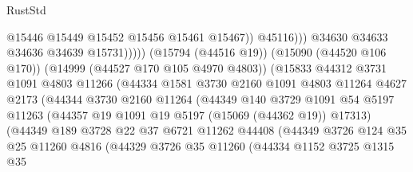 \begin{lexlean}{RustStd}
\begin{coremodule}
                                          @15446
                                          @15449
                                          @15452
                                          @15456
                                          @15461
                                          @15467))
                                      @45116)))
                                @34630
                                @34633
                                @34636
                                @34639
                                @15731)))))
                      (@15794 (@44516 @19))
                      (@15090 (@44520 @106 @170))
                      (@14999 (@44527 @170 @105 @4970 @4803))
                      (@15833
                        @44312
                        @3731
                        @1091
                        @4803
                        @11266
                        (@44334
                          @1581
                          @3730
                          @2160
                          @1091
                          @4803
                          @11264
                          @4627
                          @2173
                          (@44344
                            @3730
                            @2160
                            @11264
                            (@44349
                              @140
                              @3729
                              @1091
                              @54
                              @5197
                              @11263
                              (@44357 @19 @1091 @19 @5197 (@15069 (@44362 @19)) @17313)
                              (@44349
                                @189
                                @3728
                                @22
                                @37
                                @6721
                                @11262
                                @44408
                                (@44349
                                  @3726
                                  @124
                                  @35
                                  @25
                                  @11260
                                  @4816
                                  (@44329
                                    @3726
                                    @35
                                    @11260
                                    (@44334
                                      @1152
                                      @3725
                                      @1315
                                      @35

\end{coremodule}
\end{lexlean}
